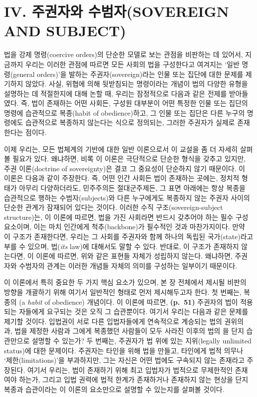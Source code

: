 \section{IV. 주권자와 수범자(SOVEREIGN AND
SUBJECT)}\label{iv.-uxc8fcuxad8cuxc790uxc640-uxc218uxbc94uxc790sovereign-and-subject}

법을 강제 명령(coercive orders)의 단순한 모델로 보는 관점을 비판하는 데
있어서, 지금까지 우리는 이러한 관점에 따르면 모든 사회의 법을 구성한다고
여겨지는 `일반 명령(general orders)'을 발하는 주권자(sovereign)라는 인물
또는 집단에 대한 문제를 제기하지 않았다. 사실, 위협에 의해 뒷받침되는
명령이라는 개념이 법의 다양한 유형을 설명하는 데 적절한지에 대해 논할
때, 우리는 잠정적으로 다음과 같은 전제를 받아들였다. 즉, 법이 존재하는
어떤 사회든, 구성원 대부분이 어떤 특정한 인물 또는 집단의 명령에
습관적으로 복종(habit of obedience)하고, 그 인물 또는 집단은 다른 누구의
명령에도 습관적으로 복종하지 않는다는 식으로 정의되는, 그러한 주권자가
실제로 존재한다는 점이다.

이제 우리는, 모든 법체계의 기반에 대한 일반 이론으로서 이 교설을 좀 더
자세히 살펴볼 필요가 있다. 왜냐하면, 비록 이 이론은 극단적으로 단순한
형식을 갖추고 있지만, 주권 이론(doctrine of sovereignty)은 결코 그
중요성이 단순하지 않기 때문이다. 이 이론은 다음과 같이 주장한다. 즉,
어떤 인간 사회든 법이 존재하는 곳에는, 정치적 형태가 아무리
다양하더라도, 민주주의든 절대군주제든, 그 표면 아래에는 항상 복종을
습관적으로 행하는 수범자(subjects)와 다른 누구에게도 복종하지 않는
주권자 사이의 단순한 관계가 잠재되어 있다는 것이다. 이러한 수직
구조(sovereign-subject structure)는, 이 이론에 따르면, 법을 가진
사회라면 반드시 갖추어야 하는 필수 구성 요소이며, 이는 마치 인간에게
척추(backbone)가 필수적인 것과 마찬가지이다. 만약 이 구조가 존재한다면,
우리는 그 사회를 주권자와 함께 하나의 독립된 국가(state)라고 부를 수
있으며,  법(\emph{its} law)에 대해서도 말할 수 있다.
반대로, 이 구조가 존재하지 않는다면, 이 이론에 따르면, 위와 같은 표현들
자체가 성립하지 않는다. 왜냐하면, 주권자와 수범자의 관계는 이러한 개념들
자체의 의미를 구성하는 일부이기 때문이다.

이 이론에서 특히 중요한 두 가지 핵심 요소가 있으며, 본 장 전체에서
제시될 비판의 방향을 개괄하기 위해 여기서 일반적인 형태로 먼저
제시해두고자 한다. 첫 번째는, 복종의 (a \emph{habit} of
obedience) 개념이다. 이 이론에 따르면, \textbf{(p.~51)} 주권자의 법이
적용되는 자들에게 요구되는 것은 오직 그 습관뿐이다. 여기서 우리는 다음과
같은 문제를 제기할 것이다. 입법권이 서로 다른 입법자들에게 연속적으로
계승되는 법의 권위의 과, 법을 제정한 사람과
그에게 복종했던 사람들이 모두 사라진 이후의 법의
을 단지 습관만으로 설명할 수 있는가? 두
번째는, 주권자가 법 위에 있는 지위(legally unlimited status)에 대한
문제이다. 주권자는 타인을 위해 법을 만들고, 타인에게 법적 의무나
`제한(limitations)'을 부과하지만, 그는 자신은 어떤 법에도 구속되지 않는
존재라고 주장된다. 여기서 우리는, 법이 존재하기 위해 최고 입법자가
법적으로 무제한적인 존재여야 하는가, 그리고 입법 권력에 법적 한계가
존재하거나 존재하지 않는 현상을 단지 복종과 습관이라는 이 이론의
요소만으로 설명할 수 있는지를 살펴볼 것이다.

